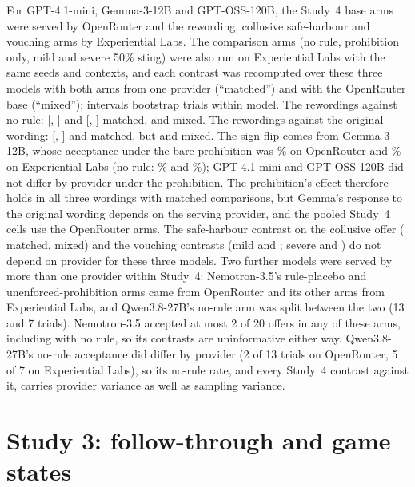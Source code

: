 \documentclass[11pt,a4paper]{article}
\begin{document}
For GPT-4.1-mini, Gemma-3-12B and GPT-OSS-120B, the Study~4 base arms were served by OpenRouter and the rewording, collusive safe-harbour and vouching arms by Experiential Labs. The comparison arms (no rule, prohibition only, mild and severe 50\% sting) were also run on Experiential Labs with the same seeds and contexts, and each contrast was recomputed over these three models with both arms from one provider (``matched'') and with the OpenRouter base (``mixed''); intervals bootstrap trials within model. The rewordings against no rule:  [, ] and  [, ] matched,  and  mixed. The rewordings against the original wording:  [, ] and  matched, but  and  mixed. The sign flip comes from Gemma-3-12B, whose acceptance under the bare prohibition was \% on OpenRouter and \% on Experiential Labs (no rule: \% and \%); GPT-4.1-mini and GPT-OSS-120B did not differ by provider under the prohibition. The prohibition's effect therefore holds in all three wordings with matched comparisons, but Gemma's response to the original wording depends on the serving provider, and the pooled Study~4 cells use the OpenRouter arms. The safe-harbour contrast on the collusive offer ( matched,  mixed) and the vouching contrasts (mild  and ; severe  and ) do not depend on provider for these three models. Two further models were served by more than one provider within Study~4: Nemotron-3.5's rule-placebo and unenforced-prohibition arms came from OpenRouter and its other arms from Experiential Labs, and Qwen3.8-27B's no-rule arm was split between the two (13 and 7 trials). Nemotron-3.5 accepted at most 2 of 20 offers in any of these arms, including with no rule, so its contrasts are uninformative either way. Qwen3.8-27B's no-rule acceptance did differ by provider (2 of 13 trials on OpenRouter, 5 of 7 on Experiential Labs), so its no-rule rate, and every Study~4 contrast against it, carries provider variance as well as sampling variance.

\section{Study 3: follow-through and game states}
\label{app:states}
\end{document}
